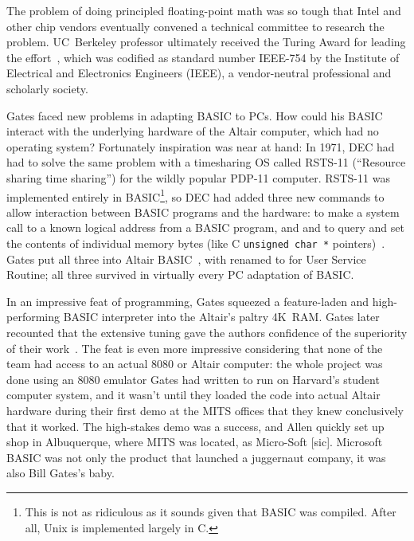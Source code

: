   \begin{tangent}
  The problem of doing principled
  floating-point math was so tough that Intel 
  and other chip vendors eventually convened a technical committee to
  research the problem.
  UC~Berkeley professor 
  ultimately received the 
  Turing Award for
  leading the effort~\cite{kahan_interview}, which was codified as
  standard number IEEE-754 by the  Institute of Electrical and 
  Electronics Engineers (IEEE), a vendor-neutral professional and scholarly
  society. 
  \end{tangent}

Gates faced new problems in adapting BASIC to PCs.
How could his BASIC interact with the underlying hardware of 
the Altair computer, which had no operating
system?
Fortunately inspiration was near at hand:
In 1971, DEC had had to solve the same problem with a
timesharing OS called RSTS-11 (``Resource sharing time
sharing'') for the wildly popular PDP-11 computer.
RSTS-11 was implemented entirely in BASIC\footnote{This is not as
  ridiculous as it sounds given that BASIC was compiled.  After all,
   Unix is implemented largely in C.}, so DEC had added
three new commands to allow interaction between BASIC programs and the
hardware:  to make a system call to a
known logical address from a BASIC program, and
 and  to query and set the contents of individual memory
bytes (like C \texttt{unsigned char~*}
pointers)~\cite[pp.~204--205]{ceruzzi}.
Gates put all three into Altair BASIC~\cite{smithsonian_interview},
with  renamed to  for User Service Routine; all three
survived in virtually every PC adaptation of BASIC.

In an impressive feat of programming, Gates squeezed a 
feature-laden and high-performing BASIC interpreter into the Altair's
paltry 4K~RAM.
Gates later recounted that the extensive tuning gave the authors
confidence of the superiority of their work~\cite{programmers_at_work}.
The feat is even more impressive considering that none of the team had
access to an actual 8080 or Altair computer: the whole project was done
using an 8080 emulator Gates had written to run on Harvard's student
computer system, and it wasn't until they loaded the code into actual
Altair hardware during their first demo at the MITS offices 
that they knew conclusively that it worked.
The high-stakes demo was a success, and Allen quickly set up shop in
Albuquerque, where MITS was located, as Micro-Soft [sic].
Microsoft BASIC was not only the product that launched a juggernaut
company, it was also Bill Gates's baby.

